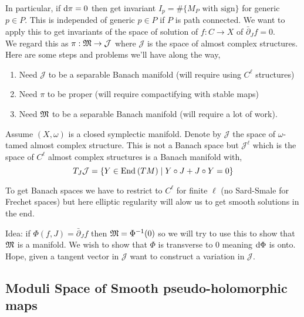 \documentclass[12pt]{article}
\newcommand{\dbar}{\bar{\partial}}
\begin{document}
\newcommand{\cJ}{\mathcal{J}}

In particular, if $\mathrm{d}{\pi} = 0$ then get invariant $I_p = \# \{ M_P \text{ with sign} \}$ for generic $p \in P$. This is independed of generic $p \in P$ if $P$ is path connected. We want to apply this to get invariants of the space of solution of $f : C \to X$ of $\dbar_J f = 0$. 
\bigskip\\
We regard this as $\pi : \mf{M} \to \cJ$ where $\cJ$ is the space of almost complex structures. Here are some steps and problems we'll have along the way,
\begin{enumerate}
\item Need $\cJ$ to be a separable Banach manifold (will require using $C^\ell$ structures)
\item Need $\pi$ to be proper (will require compactifying with stable maps)
\item Need $\mathfrak{M}$ to be a separable Banach manifold (will require a lot of work). 
\end{enumerate}

\begin{rmk}
Assume $(X, \omega)$ is a closed symplectic manifold. Denote by $\cJ$ the space of $\omega$-tamed almost complex structure. This is not a Banach space but $\cJ^\ell$ which is the space of $C^\ell$ almost complex structures is a Banach manifold with,
\[ T_{J} \cJ = \{ Y \in \End{TM} \mid Y \circ J  + J \circ Y = 0 \} \]
\end{rmk}

\begin{rmk}
To get Banach spaces we have to restrict to $C^\ell$ for finite $\ell$ (no Sard-Smale for Frechet spaces) but here elliptic regularity will alow us to get smooth solutions in the end. 
\end{rmk}

Idea: if $\Phi(f, J) = \dbar_J f$ then $\mathfrak{M} = \Phi^{-1}(0)$ so we will try to use this to show that $\mathfrak{M}$ is a manifold. We wish to show that $\Phi$ is transverse to $0$ meaning $\mathrm{d}{\Phi}$ is onto. Hope, given a tangent vector in $\cJ$ want to construct a variation in $\cJ$. 

\subsection{Moduli Space of Smooth pseudo-holomorphic maps}
\end{document}
